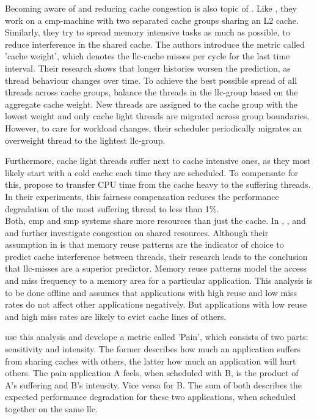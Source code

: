 Becoming aware of and reducing cache congestion is also topic of
\cite{knauerhase_using_2008}.
Like \citeauthor{banikazemi_pam_2008}, they work on a \gls{cmp}-machine with
two separated cache groups sharing an L2 cache.
Similarly, they try to spread memory intensive tasks as much as possible,
to reduce interference in the shared cache.
The authors introduce the metric called 'cache weight', which denotes the
\gls{llc}-cache misses per cycle for the last time interval.
Their research shows that longer histories worsen the prediction, as thread
behaviour changes over time.
To achieve the best possible spread of all threads across cache groups,
\citeauthor{knauerhase_using_2008} balance the threads in the \gls{llc}-group
based on the aggregate cache weight.
New threads are assigned to the cache group with the lowest weight and only
cache light threads are migrated across group boundaries.
However, to care for workload changes, their scheduler periodically migrates an
overweight thread to the lightest \gls{llc}-group.

Furthermore, cache light threads suffer next to cache intensive ones, as they
most likely start with a cold cache each time they are scheduled.
To compensate for this, \citeauthor{knauerhase_using_2008} propose to transfer
CPU time from the cache heavy to the suffering threads.
In their experiments, this fairness compensation reduces the performance
degradation of the most suffering thread to less than 1\%.
\\

Both, \gls{cmp} and \gls{smp} systems share more resources than just the cache.
In \cite{fedorova_managing_2010}, \cite{zhuravlev_addressing_2010}, and
\cite{zhuravlev_survey_2012} \citeauthor{fedorova_managing_2010} and
\citeauthor{zhuravlev_addressing_2010} further investigate congestion on shared
resources.
Although their assumption in \cite{fedorova_managing_2010} is that memory
reuse patterns are the indicator of
choice to predict cache interference between threads, their research leads to
the conclusion that \gls{llc}-misses are a superior predictor.
Memory reuse patterns model the access and miss frequency to a memory area for
a particular application.
This analysis is to be done offline and assumes that applications with high
reuse and low miss rates do not affect other applications negatively.
But applications with low reuse and high miss rates are likely to evict cache
lines of others.

\citeauthor{zhuravlev_addressing_2010} use this analysis and develope a
metric called 'Pain', which consists of two parts: sensitivity and intensity.
The former describes how much an application suffers from sharing caches with
others, the latter how much an application will hurt others.
The pain application A feels, when scheduled with B, is the product of A's
suffering and B's intensity.
Vice versa for B.
The sum of both describes the expected performance degradation for these two
applications, when scheduled together on the same \gls{llc}.

